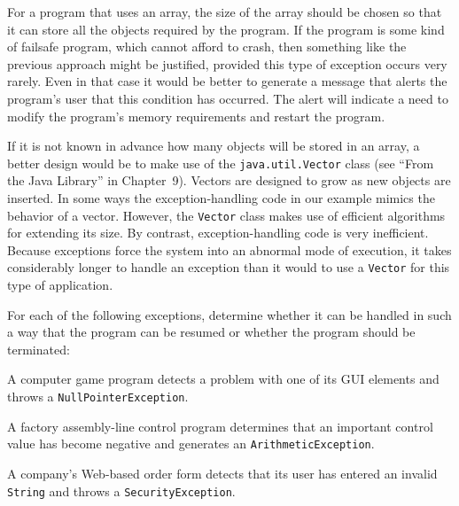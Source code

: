 \noindent For a program that uses an array, the size of the array should
be chosen so that it can store all the objects required by the
program.  If the program is some kind of failsafe program, which cannot afford
to crash, then something like the previous approach might be justified,
provided this type of exception occurs very rarely.  Even in that case
it would be better to generate a message that alerts the program's
user that this condition has occurred.   The alert will indicate a need
to modify the program's memory requirements and restart the program.


If it is not known in advance how many objects will be stored in an
array, a better design would be to make use of the
{\tt java.util.Vector} class (see ``From the Java Library'' in
Chapter~9). Vectors are
designed to grow as new objects are inserted.  In some
ways the exception-handling code in our example mimics the behavior of
a vector.   However, the {\tt Vector} class makes use of efficient
algorithms for extending its size.  By contrast, exception-handling
code is very inefficient.  Because exceptions force the system into an
abnormal mode of execution, it takes considerably longer to handle an
exception than it would to use a {\tt Vector} for this type of
application.  


\begin{SSTUDY}

\item  For each of the following exceptions, determine whether it can be
handled in such a way that the program can be resumed or whether the
program should be terminated:

\begin{EXRLL}
\item  A computer game program detects a problem with one of its GUI
elements and throws a {\tt NullPointerException}.

\item  A factory assembly-line control program determines that an
important control value has become negative and generates an
{\tt Arithmetic\-Exception}.

\item  A company's Web-based order form detects that its user has entered
an invalid {\tt String} and throws a {\tt SecurityException}.
\end{EXRLL}

\end{SSTUDY}

